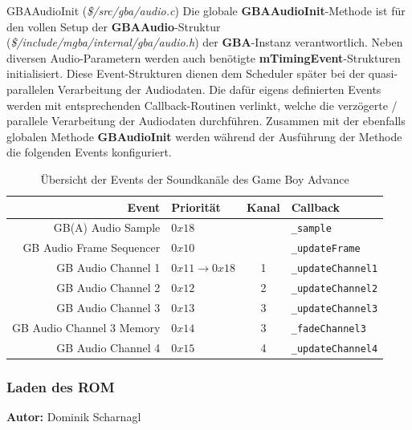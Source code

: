 \documentclass[11pt,a4paper]{scrartcl}
\newcommand{\AutorDominik} {
    \vspace{-4mm}
    \large \textbf{Autor:} Dominik Scharnagl \normalsize
    \vspace{2mm}
}
\begin{document}
\vspace{5mm}
\large GBAAudioInit \normalsize(\textit{\$/src/gba/audio.c})
\vspace{2mm}\newline
Die globale \textbf{GBAAudioInit}-Methode ist f\"ur den vollen Setup der \textbf{GBAAudio}-Struktur (\textit{\$/include/mgba/internal/gba/audio.h}) der \textbf{GBA}-Instanz verantwortlich. Neben diversen Audio-Parametern werden auch ben\"otigte \textbf{mTimingEvent}-Strukturen initialisiert. Diese Event-Strukturen dienen dem Scheduler sp\"ater bei der quasi-parallelen Verarbeitung der Audiodaten. Die daf\"ur eigens definierten Events werden mit entsprechenden Callback-Routinen verlinkt, welche die verz\"ogerte / parallele Verarbeitung der Audiodaten durchf\"uhren. Zusammen mit der ebenfalls globalen Methode \textbf{GBAudioInit} werden w\"ahrend der Ausf\"uhrung der Methode die folgenden Events konfiguriert.

\begin{table}[h]
    \centering
    \begin{tabular}{ r | p{3cm} | c | p{7cm} }
        \textbf{Event} & \textbf{Priorit\"at} & \textbf{Kanal} & \textbf{Callback} \\
        \hline
        GB(A) Audio Sample & $0x18$ & & \verb|_sample| \\
        \hline
        GB  Audio Frame Sequencer & $0x10$ & & \verb|_updateFrame| \\
        \hline
        GB Audio Channel 1 & $0x11 \rightarrow 0x18$ & 1 & \verb|_updateChannel1|  \\
        \hline
        GB Audio Channel 2 & $0x12$ & 2 & \verb|_updateChannel2| \\
        \hline
        GB Audio Channel 3 & $0x13$ & 3 & \verb|_updateChannel3| \\
        \hline
        GB Audio Channel 3 Memory & $0x14$ & 3 & \verb|_fadeChannel3| \\
        \hline
        GB Audio Channel 4 & $0x15$ & 4 & \verb|_updateChannel4| \\
    \end{tabular}
    \caption{\"Ubersicht der Events der Soundkan\"ale des Game Boy Advance}
    \label{table:SoundEvents}
\end{table}


\subsubsection{Laden des ROM}
\AutorDominik
\end{document}
